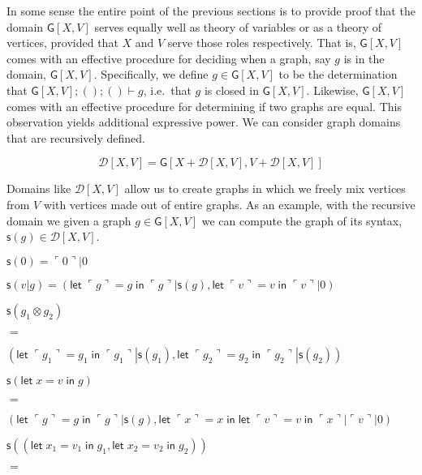 \documentclass[12pt]{llncs}
\begin{document}
In some sense the entire point of the previous sections is to provide
proof that the domain \(\mathsf{G}[X,V]\) serves equally well as theory
of variables or as a theory of vertices, provided that \(X\) and \(V\)
serve those roles respectively. That is, \(\mathsf{G}[X,V]\) comes with
an effective procedure for deciding when a graph, say \(g\) is in the
domain, \(\mathsf{G}[X,V]\). Specifically, we define
\(g \in \mathsf{G}[X,V]\) to be the determination that
\(\mathsf{G}[X,V];();() \vdash g\), i.e.~that \(g\) is closed in
\(\mathsf{G}[X,V]\). Likewise, \(\mathsf{G}[X,V]\) comes with an
effective procedure for determining if two graphs are equal. This
observation yields additional expressive power. We can consider graph
domains that are recursively defined.

\[\mathcal{D}[X,V] = \mathsf{G}[X + \mathcal{D}[X,V],V + \mathcal{D}[X,V]]\]

Domains like \(\mathcal{D}[X,V]\) allow us to create graphs in which we
freely mix vertices from \(V\) with vertices made out of entire graphs.
As an example, with the recursive domain we given a graph
\(g \in \mathsf{G}[X,V]\) we can compute the graph of its syntax,
\(\mathsf{s}(g) \in \mathcal{D}[X,V]\).

\(\mathsf{s}( 0 ) = \ulcorner 0 \urcorner | 0\)

\(\mathsf{s}( v | g ) = (\mathsf{let}\; \ulcorner g \urcorner = g \; \mathsf{in}\; \ulcorner g \urcorner | \mathsf{s}(g),\mathsf{let}\; \ulcorner v \urcorner = v \; \mathsf{in}\; \ulcorner v \urcorner | 0)\)

\(\mathsf{s}( g_1 \otimes g_2 )\)

\(=\)

\((\mathsf{let}\; \ulcorner g_1 \urcorner = g_1 \; \mathsf{in}\; \ulcorner g_1 \urcorner | \mathsf{s}(g_1),\mathsf{let}\; \ulcorner g_2 \urcorner = g_2 \; \mathsf{in}\; \ulcorner g_2 \urcorner | \mathsf{s}(g_2))\)

\(\mathsf{s}( \mathsf{let}\; x = v \;\mathsf{in}\; g )\)

\(=\)

\((\mathsf{let}\; \ulcorner g \urcorner = g \; \mathsf{in}\; \ulcorner g \urcorner | \mathsf{s}(g),\mathsf{let}\; \ulcorner x \urcorner = x \; \mathsf{in}\; \mathsf{let} \; \ulcorner v \urcorner = v \; \mathsf{in}\; \ulcorner x \urcorner | \ulcorner v \urcorner | 0)\)

\(\mathsf{s}((\mathsf{let}\; x_1 = v_1 \;\mathsf{in}\; g_1, \mathsf{let}\; x_2 = v_2 \;\mathsf{in}\; g_2))\)

\(=\)
\end{document}
